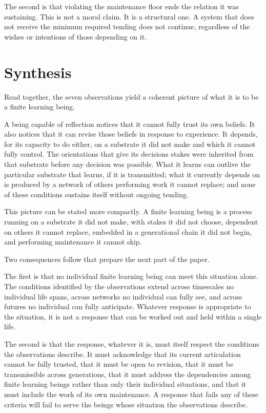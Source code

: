 \documentclass[11pt]{article}
\begin{document}
The second is that violating the maintenance floor ends the
relation it was sustaining. This is not a moral claim. It is a
structural one. A system that does not receive the minimum
required tending does not continue, regardless of the wishes or
intentions of those depending on it.

\section{Synthesis}

Read together, the seven observations yield a coherent picture of
what it is to be a finite learning being.

A being capable of reflection notices that it cannot fully trust
its own beliefs. It also notices that it can revise those beliefs
in response to experience. It depends, for its capacity to do
either, on a substrate it did not make and which it cannot fully
control. The orientations that give its decisions stakes were
inherited from that substrate before any decision was possible.
What it learns can outlive the particular substrate that learns,
if it is transmitted; what it currently depends on is produced by
a network of others performing work it cannot replace; and none of
these conditions sustains itself without ongoing tending.

This picture can be stated more compactly. A finite learning
being is a process running on a substrate it did not make, with
stakes it did not choose, dependent on others it cannot replace,
embedded in a generational chain it did not begin, and performing
maintenance it cannot skip.

Two consequences follow that prepare the next part of the paper.

The first is that no individual finite learning being can meet
this situation alone. The conditions identified by the
observations extend across timescales no individual life spans,
across networks no individual can fully see, and across futures
no individual can fully anticipate. Whatever response is
appropriate to the situation, it is not a response that can be
worked out and held within a single life.

The second is that the response, whatever it is, must itself
respect the conditions the observations describe. It must
acknowledge that its current articulation cannot be fully
trusted, that it must be open to revision, that it must be
transmissible across generations, that it must address the
dependencies among finite learning beings rather than only their
individual situations, and that it must include the work of its
own maintenance. A response that fails any of these criteria
will fail to serve the beings whose situation the observations
describe.
\end{document}
